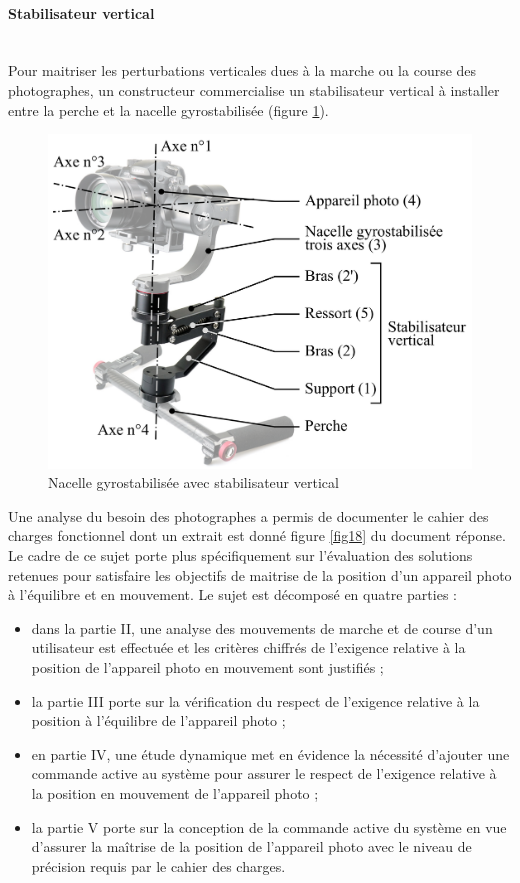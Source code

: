 \newpage

\paragraph{Stabilisateur vertical} ~\ \\ Pour maitriser les perturbations verticales dues à la marche ou la course des photographes, un constructeur commercialise un stabilisateur vertical à installer entre la perche et la nacelle gyrostabilisée (figure \ref{fig02}).

\begin{figure}[ht!]
\begin{center}
 \includegraphics[width=0.7\linewidth]{img/fig02}
\end{center}
\caption{Nacelle gyrostabilisée avec stabilisateur vertical}
\label{fig02}
\end{figure}

Une analyse du besoin des photographes a permis de documenter le cahier des charges fonctionnel dont un extrait est donné figure \ref{fig18} du document réponse. Le cadre de ce sujet porte plus spécifiquement sur l'évaluation des solutions retenues pour satisfaire les objectifs de maitrise de la position d'un appareil photo à l'équilibre et en mouvement. Le sujet est décomposé en quatre parties :
\begin{itemize}
 \item dans la partie II, une analyse des mouvements de marche et de course d'un utilisateur est effectuée et les critères chiffrés de l'exigence relative à la position de l'appareil photo en mouvement sont justifiés ;
 \item la partie III porte sur la vérification du respect de l'exigence relative à la position à l'équilibre de l'appareil
photo ;
 \item en partie IV, une étude dynamique met en évidence la nécessité d'ajouter une commande active au système pour assurer le respect de l'exigence relative à la position en mouvement de l'appareil photo ;
 \item la partie V porte sur la conception de la commande active du système en vue d'assurer la maîtrise de la position de l'appareil photo avec le niveau de précision requis par le cahier des charges.
\end{itemize}


